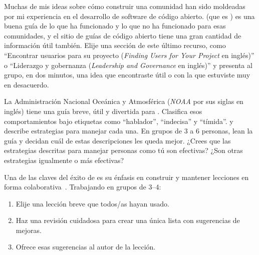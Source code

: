 
Muchas de mis ideas sobre cómo construir una comunidad 
han sido moldeadas por mi experiencia en el desarrollo de software de código abierto.
\cite{Foge2005} (que es )
es una buena guía de lo que ha funcionado y lo que no ha funcionado para esas comunidades,
y el  {sitio de guías de código abierto}
tiene una gran cantidad de información útil también.
Elije una sección de este último recurso, como ``Encontrar usuarios para su proyecto (\emph{Finding Users for Your Project} en inglés)''
o ``Liderazgo y gobernanza (\emph{Leadership and Governance} en inglés)''
y presenta al grupo, en dos minutos, una idea 
que encontraste útil o con la que estuviste muy en desacuerdo.


La Administración Nacional Oceánica y Atmosférica (\emph{NOAA} por sus siglas en inglés)
tiene una guía breve, útil y divertida para
.
Clasifica esos comportamientos bajo etiquetas como ``hablador'', ``indecisa'' y ``tímida''.
y describe estrategias para manejar cada una.
En grupos de 3 a 6 personas,
lean la guía y decidan cuál de estas descripciones les queda mejor.
¿Crees que las estrategias descritas para manejar personas como tú son efectivas?
¿Son otras estrategias igualmente o más efectivas?


Una de las claves del éxito de 
es su énfasis en construir y mantener lecciones en forma colaborativa~\cite{Wils2016,Deve2018}.
Trabajando en grupos de 3--4:

\begin{enumerate}

\item
  Elije una lección breve que todos/as hayan usado.

\item
  Haz una revisión cuidadosa para crear una única lista con sugerencias de mejoras.

\item
  Ofrece esas sugerencias al autor de la lección.

\end{enumerate}

